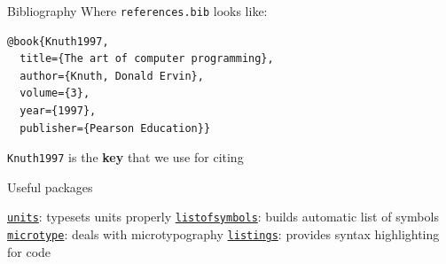\begin{frame}[fragile]{Bibliography}
Where \texttt{references.bib} looks like:

\begin{lstlisting}[breaklines=false]
@book{Knuth1997,
  title={The art of computer programming},
  author={Knuth, Donald Ervin},
  volume={3},
  year={1997},
  publisher={Pearson Education}}
\end{lstlisting}

\vspace{3ex}
 \begin{fullpageitemize}
  \itemR \texttt{Knuth1997} is the \textbf{key} that we use for citing
 \end{fullpageitemize}


\end{frame}

\begin{frame}{Useful packages}
 \begin{fullpageitemize}
  \itemR \href{https://ctan.org/tex-archive/macros/latex/contrib/units/}{\texttt{units}}: typesets units properly
  \itemR \href{https://www.ctan.org/pkg/listofsymbols}{\texttt{listofsymbols}}: builds automatic list of symbols
  \itemR \href{https://ctan.org/tex-archive/macros/latex/contrib/microtype/}{\texttt{microtype}}: deals with microtypography
  \itemR \href{https://www.ctan.org/pkg/listings}{\texttt{listings}}: provides syntax highlighting for code
\end{fullpageitemize}


\end{frame}

